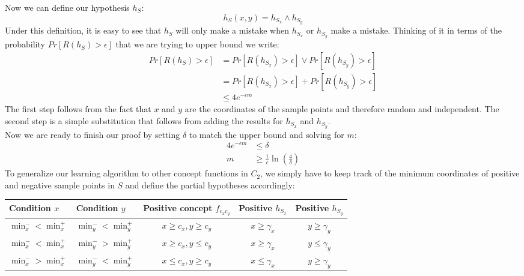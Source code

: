 \documentclass{article}
\begin{document}
\begin{enumerate}[1.]
        Now we can define our hypothesis $h_S$:
        \begin{equation*}
            h_S(x,y) = h_{S_x} \wedge h_{S_y}
        \end{equation*}
        Under this definition, it is easy to see that $h_S$ will only make a mistake when $h_{S_x}$ or $h_{S_y}$ make a mistake. Thinking of it in terms of the probability $Pr[R(h_S) > \epsilon]$ that we are trying to upper bound we write:
        \begin{align*}
            Pr[R(h_S) > \epsilon] &= Pr[R(h_{S_x}) > \epsilon] \lor Pr[R(h_{S_y}) > \epsilon] \\
                                  &= Pr[R(h_{S_x}) > \epsilon] + Pr[R(h_{S_y}) > \epsilon] \\
                                  &\leq 4e^{-\epsilon m}
        \end{align*}
        The first step follows from the fact that $x$ and $y$ are the coordinates of the sample points and therefore random and independent. The second step is a simple substitution that follows from adding the results for $h_{S_x}$ and $h_{S_y}$.\\
        Now we are ready to finish our proof by setting $\delta$ to match the upper bound and solving for $m$:
        \begin{align*}
            4e^{-\epsilon m} &\leq \delta \\
            m &\geq \frac{1}{\epsilon}\ln\left(\frac{4}{\delta}\right)
        \end{align*}
        To generalize our learning algorithm to other concept functions in $C_2$, we simply have to keep track of the minimum coordinates of positive and negative sample points in $S$ and define the partial hypotheses accordingly:
    	\begin{table}[ht]
    		\centering
    		\begin{tabular}{llccc}
    			\toprule
    			Condition $x$ & Condition $y$ & Positive concept $f_{c_xc_y}$ & Positive $h_{S_x}$ & Positive $h_{S_y}$ \\
    			\midrule
    			$\min_x^- < \min_x^+$ & $\min_y^- < \min_y^+$ & $x \geq c_x,y \geq c_y$ & $x \geq \gamma_x$ & $y \geq \gamma_y$ \\
    			$\min_x^- < \min_x^+$ & $\min_y^- > \min_y^+$ & $x \geq c_x,y \leq c_y$ & $x \geq \gamma_x$ & $y \leq \gamma_y$ \\
    			$\min_x^- > \min_x^+$ & $\min_y^- < \min_y^+$ & $x \leq c_x,y \geq c_y$ & $x \leq \gamma_x$ & $y \geq \gamma_y$ \\

\end{tabular}
\end{table}
\end{enumerate}
\end{document}
